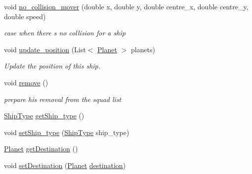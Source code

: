 \begin{DoxyCompactItemize}
void \hyperlink{classfr_1_1groupe40_1_1projet_1_1model_1_1ships_1_1_ship_af506b10fa38eae488d02c08fccb3d7df}{no\+\_\+collision\+\_\+mover} (double x, double y, double centre\+\_\+x, double centre\+\_\+y, double speed)
\begin{DoxyCompactList}\small\item\em case when there s no collision for a ship \end{DoxyCompactList}\item 
void \hyperlink{classfr_1_1groupe40_1_1projet_1_1model_1_1ships_1_1_ship_af4fcf4bf2b5fdad442d33491c69b2019}{update\+\_\+position} (List$<$ \hyperlink{classfr_1_1groupe40_1_1projet_1_1model_1_1planets_1_1_planet}{Planet} $>$ planets)
\begin{DoxyCompactList}\small\item\em Update the position of this ship. \end{DoxyCompactList}\item 
\mbox{\label{classfr_1_1groupe40_1_1projet_1_1model_1_1ships_1_1_ship_a2d132d6ec4b6025f82cf687916bb7f95}} 
void \hyperlink{classfr_1_1groupe40_1_1projet_1_1model_1_1ships_1_1_ship_a2d132d6ec4b6025f82cf687916bb7f95}{remove} ()
\begin{DoxyCompactList}\small\item\em prepare his removal from the squad list \end{DoxyCompactList}\item 
\hyperlink{classfr_1_1groupe40_1_1projet_1_1model_1_1ships_1_1_ship_type}{Ship\+Type} \hyperlink{classfr_1_1groupe40_1_1projet_1_1model_1_1ships_1_1_ship_af2ee5ad92b1137894f467076e158fc95}{get\+Ship\+\_\+type} ()
\item 
void \hyperlink{classfr_1_1groupe40_1_1projet_1_1model_1_1ships_1_1_ship_a7bbf63c47f60e88943422e04877c161f}{set\+Ship\+\_\+type} (\hyperlink{classfr_1_1groupe40_1_1projet_1_1model_1_1ships_1_1_ship_type}{Ship\+Type} ship\+\_\+type)
\item 
\hyperlink{classfr_1_1groupe40_1_1projet_1_1model_1_1planets_1_1_planet}{Planet} \hyperlink{classfr_1_1groupe40_1_1projet_1_1model_1_1ships_1_1_ship_ac4f24f0b83dfec2b15cf455c79b75e24}{get\+Destination} ()
\item 
void \hyperlink{classfr_1_1groupe40_1_1projet_1_1model_1_1ships_1_1_ship_abdc025f4461e7efd9a2ee6af93d9bef3}{set\+Destination} (\hyperlink{classfr_1_1groupe40_1_1projet_1_1model_1_1planets_1_1_planet}{Planet} \hyperlink{classfr_1_1groupe40_1_1projet_1_1model_1_1ships_1_1_ship_a19eb504f8a0c0e263aff1e85e5e7557a}{destination})

\end{DoxyCompactItemize}
